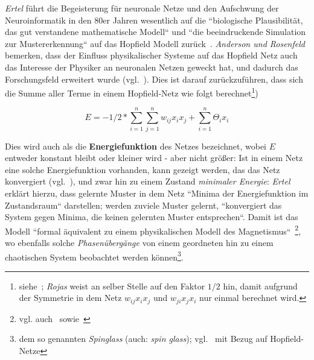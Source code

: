 \textit{Ertel} führt die Begeisterung für neuronale Netze und den Aufschwung der Neuroinformatik in den 80er Jahren wesentlich auf die ``biologische Plausibilität, das gut verstandene mathematische Modell`` und ``die beeindruckende Simulation zur Mustererkennung`` auf das Hopfield Modell zurück~\cite[297]{Ert21b}. \textit{Anderson und Rosenfeld} bemerken, dass der Einfluss physikalischer Systeme auf das Hopfield Netz auch das Interesse der Physiker an neuronalen Netzen geweckt hat, und dadurch das Forschungsfeld erweitert wurde (vgl.~\cite[458]{AR88}). Dies ist darauf zurückzuführen, dass sich die Summe aller Terme in einem Hopfield-Netz wie folgt berechnet\footnote{
    siehe~\cite[287]{Roj93}; \textit{Rojas} weist an selber Stelle auf den Faktor $1/2$ hin, damit aufgrund der Symmetrie in dem Netz $w_{ij}x_ix_j$ und $w_{ji}x_jx_i$ nur einmal berechnet wird.
})

\begin{equation}
E = -1/2 * \sum^n_{i=1}\sum^n_{j=1} w_{ij}x_ix_j + \sum^n_{i=1}\Theta_ix_i
\label{eq:gl-energie}
\end{equation}

Dies wird auch als die \textbf{Energiefunktion} des Netzes bezeichnet, wobei $E$ entweder konstant bleibt oder kleiner wird - aber nicht größer: Ist in einem Netz eine solche Energiefunktion vorhanden, kann gezeigt werden, das das Netz konvergiert (vgl.~\cite[139]{Fau94}), und zwar hin zu einem Zustand \textit{minimaler Energie}: \textit{Ertel} erklärt hierzu, dass gelernte Muster in dem Netz ``Minima der Energiefunktion im Zustandsraum`` darstellen; werden zuviele Muster gelernt, ``konvergiert das System gegen Minima, die keinen gelernten Muster entsprechen``.
Damit ist das Modell ``formal äquivalent zu einem physikalischen Modell des Magnetismus``~\cite[293]{Ert21b}\footnote{
    vgl. auch~\cite[417]{AR98} sowie~\cite[2556 f.]{Hop82}
}, wo ebenfalls solche \textit{Phasenübergänge} von einem geordneten hin zu einem chaotischen System beobachtet werden können\footnote{
    dem so genannten \textit{Spinglass} (auch: \textit{spin glass}); vgl.~\cite[900]{BY86} mit Bezug auf Hopfield-Netze
}.\\

